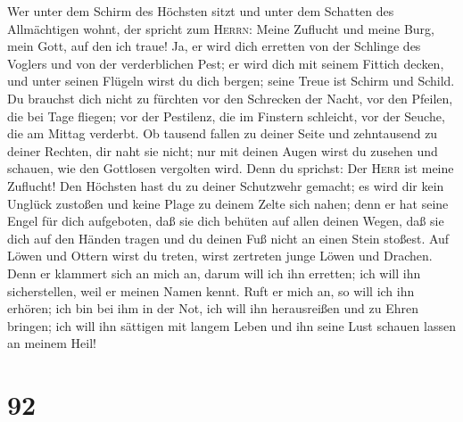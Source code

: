 Wer unter dem Schirm des Höchsten sitzt und unter dem
Schatten des Allmächtigen wohnt,  der spricht zum
\textsc{Herrn}: Meine Zuflucht und meine Burg, mein Gott, auf den ich
traue!  Ja, er wird dich erretten von der Schlinge des
Voglers und von der verderblichen Pest;  er wird dich mit
seinem Fittich decken, und unter seinen Flügeln wirst du dich bergen;
seine Treue ist Schirm und Schild.  Du brauchst dich nicht
zu fürchten vor den Schrecken der Nacht, vor den Pfeilen, die bei Tage
fliegen;  vor der Pestilenz, die im Finstern schleicht,
vor der Seuche, die am Mittag verderbt.  Ob tausend fallen
zu deiner Seite und zehntausend zu deiner Rechten, dir naht sie nicht;
 nur mit deinen Augen wirst du zusehen und schauen, wie
den Gottlosen vergolten wird.  Denn du sprichst: Der
\textsc{Herr} ist meine Zuflucht! Den Höchsten hast du zu deiner
Schutzwehr gemacht;  es wird dir kein Unglück zustoßen
und keine Plage zu deinem Zelte sich nahen;  denn er hat
seine Engel für dich aufgeboten, daß sie dich behüten auf allen deinen
Wegen,  daß sie dich auf den Händen tragen und du deinen
Fuß nicht an einen Stein stoßest.  Auf Löwen und Ottern
wirst du treten, wirst zertreten junge Löwen und Drachen.
 Denn er klammert sich an mich an, darum will ich ihn
erretten; ich will ihn sicherstellen, weil er meinen Namen kennt.
 Ruft er mich an, so will ich ihn erhören; ich bin bei
ihm in der Not, ich will ihn herausreißen und zu Ehren bringen;
 ich will ihn sättigen mit langem Leben und ihn seine
Lust schauen lassen an meinem Heil!

\hypertarget{section-91}{%
\section{92}\label{section-91}}

